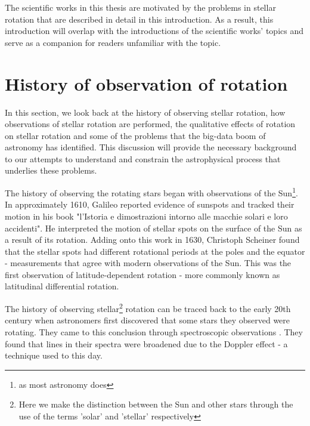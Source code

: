 The scientific works in this thesis are motivated by the problems in stellar rotation that are described in detail in this introduction. As a result, this introduction will overlap with the introductions of the scientific works' topics and serve as a companion for readers unfamiliar with the topic.

\section{History of observation of rotation}
\label{sec:history}

In this section, we look back at the history of observing stellar rotation, how observations of stellar rotation are performed, the qualitative effects of rotation on stellar rotation and some of the problems that the big-data boom of astronomy has identified.
This discussion will provide the necessary background to our attempts to understand and constrain the astrophysical process that underlies these problems.

The history of observing the rotating stars began with observations of the Sun\footnote{as most astronomy does}. 
In approximately 1610, Galileo reported evidence of sunspots and tracked their motion in his book "l'Istoria e dimostrazioni intorno alle macchie solari e loro accidenti". 
He interpreted the motion of stellar spots on the surface of the Sun as a result of its rotation. 
Adding onto this work in 1630, Christoph Scheiner found that the stellar spots had different rotational periods at the poles and the equator - measurements that agree with modern observations of the Sun. 
This was the first observation of latitude-dependent rotation - more commonly known as latitudinal differential rotation. 

The history of observing stellar\footnote{Here we make the distinction between the Sun and other stars through the use of the terms 'solar' and 'stellar' respectively} rotation can be traced back to the early 20th century when astronomers first discovered that some stars they observed were rotating. 
They came to this conclusion through spectroscopic observations \citep{elvey_contours_1929, struve_stellar_1930, struve_axial_1930}.
They found that lines in their spectra were broadened due to the Doppler effect - a technique used to this day.

